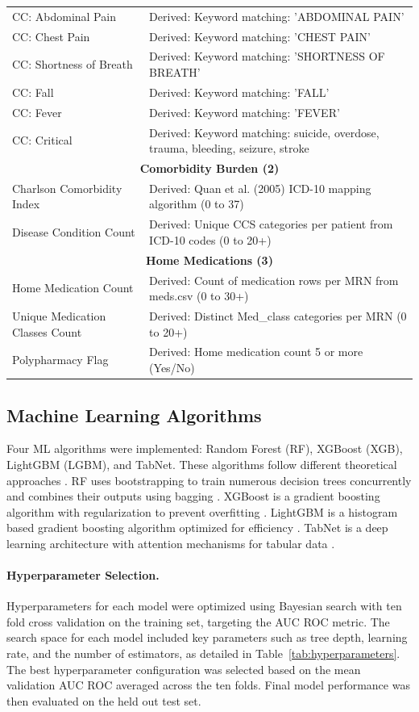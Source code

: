 \documentclass[harvard,article]{frontiersinFPHY_FAMS}
\begin{document}
\begin{table}[H]
\begin{tabularx}{\textwidth}{@{}l X@{}}
CC: Abdominal Pain & Derived: Keyword matching: 'ABDOMINAL PAIN' \\
CC: Chest Pain & Derived: Keyword matching: 'CHEST PAIN' \\
CC: Shortness of Breath & Derived: Keyword matching: 'SHORTNESS OF BREATH' \\
CC: Fall & Derived: Keyword matching: 'FALL' \\
CC: Fever & Derived: Keyword matching: 'FEVER' \\
CC: Critical & Derived: Keyword matching: suicide, overdose, trauma, bleeding, seizure, stroke \\
\midrule
\multicolumn{2}{c}{\textbf{Comorbidity Burden (2)}} \\
\midrule
Charlson Comorbidity Index & Derived: Quan et al. (2005) ICD-10 mapping algorithm (0 to 37) \\
Disease Condition Count & Derived: Unique CCS categories per patient from ICD-10 codes (0 to 20+) \\
\midrule
\multicolumn{2}{c}{\textbf{Home Medications (3)}} \\
\midrule
Home Medication Count & Derived: Count of medication rows per MRN from meds.csv (0 to 30+) \\
Unique Medication Classes Count & Derived: Distinct Med\_class categories per MRN (0 to 20+) \\
Polypharmacy Flag & Derived: Home medication count 5 or more (Yes/No) \\
\bottomrule
\end{tabularx}
\end{table}


\subsection{Machine Learning Algorithms}

Four ML algorithms were implemented: Random Forest (RF), XGBoost (XGB), LightGBM (LGBM), and TabNet. These algorithms follow different theoretical approaches \cite{ricciardi2024, wu2025}. RF uses bootstrapping to train numerous decision trees concurrently and combines their outputs using bagging \cite{ricciardi2024}. XGBoost is a gradient boosting algorithm with regularization to prevent overfitting \cite{wang2025}. LightGBM is a histogram based gradient boosting algorithm optimized for efficiency \cite{wu2025}. TabNet is a deep learning architecture with attention mechanisms for tabular data \cite{lin2024}.

\paragraph{Hyperparameter Selection.}
Hyperparameters for each model were optimized using Bayesian search with ten fold cross validation on the training set, targeting the AUC ROC metric. The search space for each model included key parameters such as tree depth, learning rate, and the number of estimators, as detailed in Table~\ref{tab:hyperparameters}. The best hyperparameter configuration was selected based on the mean validation AUC ROC averaged across the ten folds. Final model performance was then evaluated on the held out test set.
\end{document}
